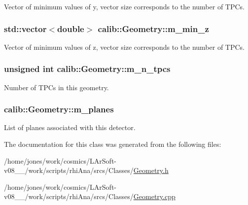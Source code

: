 Vector of minimum values of y, vector size corresponds to the number of T\-P\-Cs. 

\hypertarget{classcalib_1_1Geometry_ac81ad69998b30f5e38e5702823cdee59}{
\subsubsection[{m\-\_\-min\-\_\-z}]{\setlength{\rightskip}{0pt plus 5cm}std\-::vector$<$double$>$ calib\-::\-Geometry\-::m\-\_\-min\-\_\-z\hspace{0.3cm}{\ttfamily [private]}}}\label{classcalib_1_1Geometry_ac81ad69998b30f5e38e5702823cdee59}


Vector of minimum values of z, vector size corresponds to the number of T\-P\-Cs. 

\hypertarget{classcalib_1_1Geometry_aeeec1ee84e1de131ef1a98a042dd7a71}{
\subsubsection[{m\-\_\-n\-\_\-tpcs}]{\setlength{\rightskip}{0pt plus 5cm}unsigned int calib\-::\-Geometry\-::m\-\_\-n\-\_\-tpcs\hspace{0.3cm}{\ttfamily [private]}}}\label{classcalib_1_1Geometry_aeeec1ee84e1de131ef1a98a042dd7a71}


Number of T\-P\-Cs in this geometry. 

\hypertarget{classcalib_1_1Geometry_a8fd38a59fc353679755a7c08221cae77}{
\subsubsection[{m\-\_\-planes}]{ calib\-::\-Geometry\-::m\-\_\-planes\hspace{0.3cm}{\ttfamily [private]}}}\label{classcalib_1_1Geometry_a8fd38a59fc353679755a7c08221cae77}


List of planes associated with this detector. 



The documentation for this class was generated from the following files\-:\begin{DoxyCompactItemize}
\item 
/home/jones/work/cosmics/\-L\-Ar\-Soft-\/v08\-\_\-\_/work/scripts/rhi\-Ana/srcs/\-Classes/\hyperlink{Geometry_8h}{Geometry.\-h}\item 
/home/jones/work/cosmics/\-L\-Ar\-Soft-\/v08\-\_\-\_/work/scripts/rhi\-Ana/srcs/\-Classes/\hyperlink{Geometry_8cpp}{Geometry.\-cpp}\end{DoxyCompactItemize}
